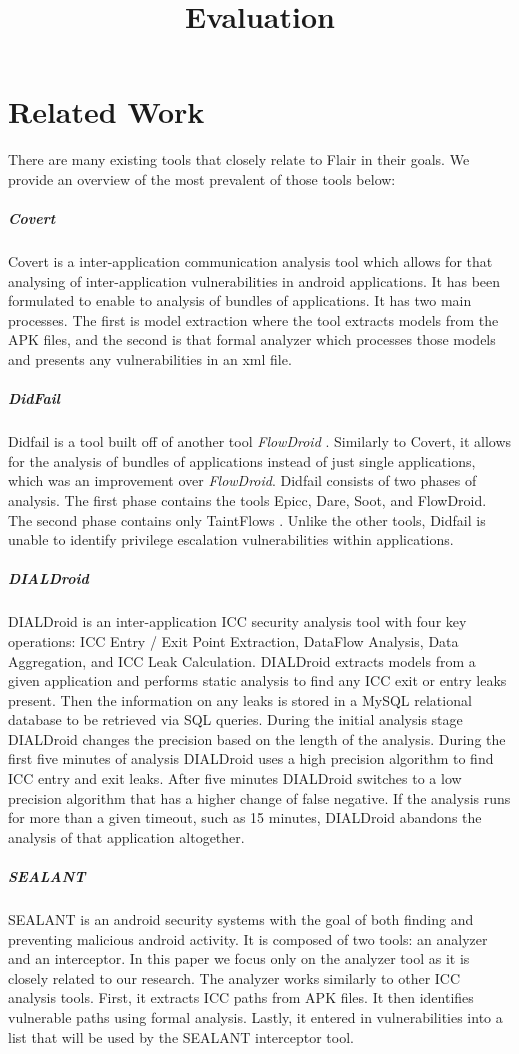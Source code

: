 \documentclass[twocolumn]{article}
\title{Evaluation}
\begin{document}
\section[1]{Related Work}
	There are many existing tools that closely relate to Flair in their goals. We provide an overview of the most prevalent of those tools below:
	\subparagraph{Covert}
		Covert is a inter-application communication analysis tool which allows for that analysing of inter-application vulnerabilities in android applications. It has been formulated to enable to analysis of bundles of applications. It has two main processes. The first is model extraction where the tool extracts models from the APK files, and the second is that formal analyzer which processes those models and presents any vulnerabilities in an xml file\cite{Covert}.
	\subparagraph{DidFail}
		Didfail is a tool built off of another tool \textit{FlowDroid} \cite{Didfail}. Similarly to Covert, it allows for the analysis of bundles of applications instead of just single applications, which was an improvement over \textit{FlowDroid}. Didfail consists of two phases of analysis. The first phase contains the tools Epicc, Dare, Soot, and FlowDroid. The second phase contains only TaintFlows \cite{Didfail}. Unlike the other tools, Didfail is unable to identify privilege escalation vulnerabilities within applications. 

	\subparagraph{DIALDroid}
		DIALDroid is an inter-application ICC security analysis tool with four key operations: ICC Entry / Exit Point Extraction, DataFlow Analysis, Data Aggregation, and ICC Leak Calculation\cite{DIALDroid}. DIALDroid extracts models from a given application and performs static analysis to find any ICC exit or entry leaks present. Then the information on any leaks is stored in a MySQL relational database to be retrieved via SQL queries. During the initial analysis stage DIALDroid changes the precision based on the length of the analysis. During the first five minutes of analysis DIALDroid uses a high precision algorithm to find ICC entry and exit leaks. After five minutes DIALDroid switches to a low precision algorithm that has a higher change of false negative. If the analysis runs for more than a given timeout, such as 15 minutes, DIALDroid abandons the analysis of that application altogether\cite{DIALDroid}.
	\subparagraph{SEALANT}
		SEALANT is an android security systems with the goal of both finding and preventing malicious android activity. It is composed of two tools: an analyzer and an interceptor. In this paper we focus only on the analyzer tool as it is closely related to our research. The analyzer works similarly to other ICC analysis tools. First, it extracts ICC paths from APK files. It then identifies vulnerable paths using formal analysis. Lastly, it entered in vulnerabilities into a list that will be used by the SEALANT interceptor tool.
\end{document}
